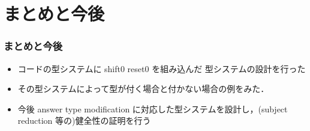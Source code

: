 \documentclass[dvipdfmx,cjk,xcolor=dvipsnames,envcountsect,notheorems,12pt]{beamer}
\theoremstyle{definition}
\begin{document}
\section{まとめと今後}
\begin{frame}
  \frametitle{まとめと今後}
  \begin{itemize}
  \item コードの型システムに shift0 reset0 を組み込んだ 型システムの設計を行った
  \item その型システムによって型が付く場合と付かない場合の例をみた．
  \item 今後 answer type modification に対応した型システムを設計し，(subject reduction 等の)健全性の証明を行う
  \end{itemize}
\end{frame}
\end{document}

